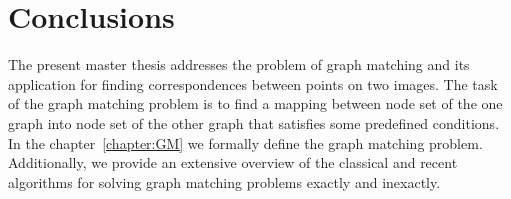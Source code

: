 \chapter{Conclusions } \label{chapter:conclusions}
The present master thesis addresses the problem of graph matching and its application for finding correspondences between points on two images. The task of the graph matching problem is to find a mapping between node set of the one graph into node set of the other graph that satisfies some predefined conditions. In the chapter~\ref{chapter:GM} we formally define the graph matching problem. 
Additionally, we provide an extensive overview of the classical and recent algorithms for solving graph matching problems exactly and inexactly. 


